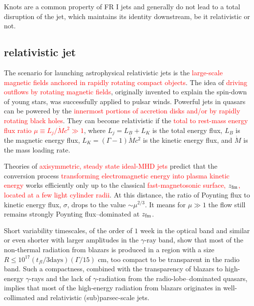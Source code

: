 \documentclass[12pt,a4paper]{article}
\begin{document}
Knots are a common property of FR I jets and generally do not lead to a total disruption of the jet, which maintains its identity downstream, be it relativistic or not.









\subsection{relativistic jet}
\cite{2005ApJ...625...72S} The scenario for launching astrophysical relativistic jets is the \textcolor{red}{large-scale magnetic fields anchored in rapidly rotating compact objects}. The idea of \textcolor{red}{driving outflows by rotating magnetic fields}, originally invented to explain the spin-down of young stars, was successfully applied to pulsar winds. Powerful jets in quasars can be powered by the \textcolor{red}{innermost portions of accretion disks and/or by rapidly rotating black holes}. They can become relativistic if the \textcolor{red}{total to rest-mass energy flux ratio $\mu \equiv L_j/\dot{M}c^2 \gg 1$}, where $L_j = L_B + L_K$ is the total energy flux, $L_B$ is the magnetic energy flux, $L_K = (\Gamma-1)\dot{M}c^2$ is the kinetic energy flux, and $\dot{M}$ is the mass loading rate. 

Theories of \textcolor{red}{axisymmetric, steady state ideal-MHD jets} predict that the conversion process \textcolor{red}{transforming electromagnetic energy into plasma kinetic energy} works efficiently only up to the classical \textcolor{red}{fast-magnetosonic surface, $z_{\rm fm}$, located at a few light cylinder radii}. At this distance, the ratio of Poynting flux to kinetic energy flux, $\sigma$, drops to the value $\sim \mu^{2/3}$. It means for $\mu \gg 1$ the flow still remains strongly Poynting flux–dominated at $z_{\rm fm}$.

Short variability timescales, of the order of $1$ week in the optical band and similar or even shorter with larger amplitudes in the $\gamma$-ray band, show that most of the non-thermal radiation from blazars is produced in a region with a size $R \leqslant 10^{17} (t_{fl}/3 \text{days})(\Gamma /15)$ cm, too compact to be transparent in the radio band. Such a compactness, combined with the transparency of blazars to high-energy $\gamma$-rays and the lack of $\gamma$-radiation from the radio-lobe–dominated quasars, implies that most of the high-energy radiation from blazars originates in well-collimated and relativistic
(sub)parsec-scale jets.
\end{document}

